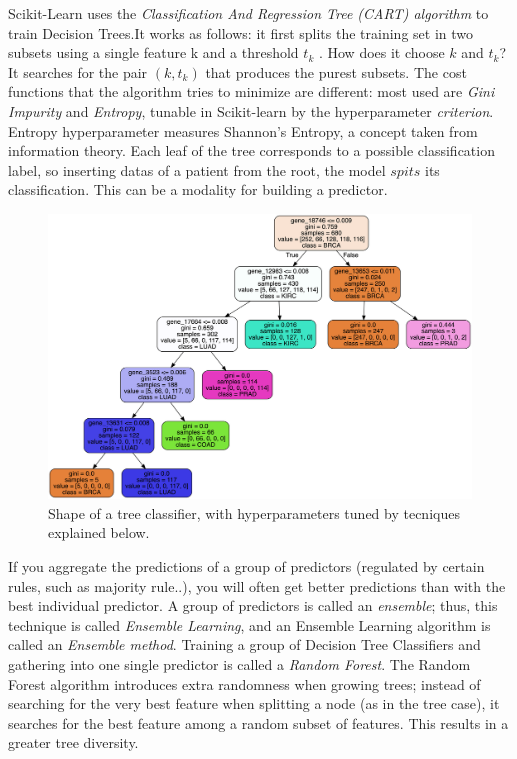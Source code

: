 \documentclass{article}
\begin{document}
Scikit-Learn uses the \textit{Classification And Regression Tree (CART) algorithm} to train Decision Trees.It works as follows: it first splits the training set in two subsets using a single feature k and a threshold $t_k$ . How does it choose $k$ and $t_k$? It searches for the pair $(k, t_k)$ that produces the purest subsets. The cost functions that the algorithm tries to minimize are different: most used are \textit{Gini Impurity} and \textit{Entropy}, tunable in Scikit-learn by the hyperparameter \textit{criterion}. Entropy hyperparameter measures Shannon's Entropy, a concept taken from information theory.
Each leaf of the tree corresponds to a possible classification label, so inserting datas of a patient from the root, the model $spits$ its classification. This can be a modality for building a predictor.

\begin{figure}
\centering
\includegraphics[width=\linewidth]{img/tree_best.png}
\caption{Shape of a tree classifier, with hyperparameters tuned by tecniques explained below.}
\label{fig1}
\end{figure}

If you aggregate the predictions of a group of predictors (regulated by certain rules, such as majority rule..), you will often get better predictions than with the best individual predictor. A group of predictors is called an \textit{ensemble}; thus, this technique is called \textit{Ensemble Learning}, and an Ensemble Learning algorithm is called an \textit{Ensemble method}.
Training a group of Decision Tree Classifiers and gathering into one single predictor is called a \textit{Random Forest}.
The Random Forest algorithm introduces extra randomness when growing trees; instead of searching for the very best feature when splitting a node (as in the tree case), it searches for the best feature among a random subset of features. This results in a greater tree diversity.
\end{document}
